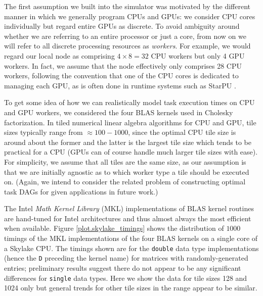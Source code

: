 \documentclass[runningheads]{llncs}
\begin{document}
The first assumption we built into the simulator was motivated by the different manner in which we generally program CPUs and GPUs: we consider CPU cores individually but regard entire GPUs as discrete. To avoid ambiguity around whether we are referring to an entire processor or just a core, from now on we will refer to all discrete processing resources as {\em workers}. For example, we would regard our local node as comprising $4 \times 8 = 32$ CPU workers but only 4 GPU workers. In fact, we assume that the node effectively only comprises 28 CPU workers, following the convention that one of the CPU cores is dedicated to managing each GPU, as is often done in runtime systems such as StarPU \cite{augonnet2011starpu}. 

To get some idea of how we can realistically model task execution times on CPU and GPU workers, we considered the four BLAS kernels used in Cholesky factorization. In tiled numerical linear algebra algorithms for CPU and GPU, tile sizes typically range from $\approx 100-1000$, since the optimal CPU tile size is around about the former and the latter is the largest tile size which tends to be practical for a CPU (GPUs can of course handle much larger tile sizes with ease). For simplicity, we assume that all tiles are the same size, as our assumption is that we are initially agnostic as to which worker type a tile should be executed on. (Again, we intend to consider the related problem of constructing optimal task DAGs for given applications in future work.)   

The Intel {\em Math Kernel Library} (MKL) implementations of BLAS kernel routines are hand-tuned for Intel architectures and thus almost always the most efficient when available. Figure \ref{plot.skylake_timings} shows the distribution of $1000$ timings of the MKL implementations of the four BLAS kernels on a single core of a Skylake CPU. The timings shown are for the {\tt double} data type implementations (hence the {\tt D} preceding the kernel name) for matrices with randomly-generated entries; preliminary results suggest there do not appear to be any significant differences for {\tt single} data types. Here we show the data for tile sizes 128 and 1024 only but general trends for other tile sizes in the range appear to be similar.
\end{document}
